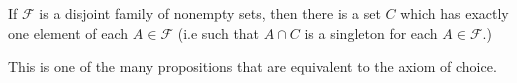 \documentclass[12pt]{article}
\begin{document}
If $\mathcal{F}$ is a disjoint family of nonempty sets, then there is a set $C$ which has exactly one element of each $A\in \mathcal{F}$ (i.e such that $A\cap C$ is a singleton for each $A\in \mathcal{F}$.)

This is one of the many propositions that are equivalent to the axiom of choice.
\end{document}
